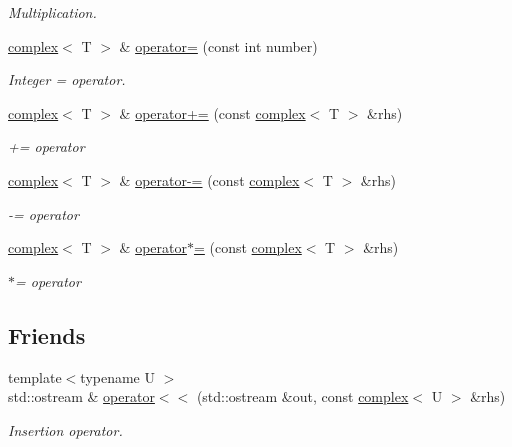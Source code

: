 \begin{DoxyCompactItemize}
\begin{DoxyCompactList}\small\item\em Multiplication. \end{DoxyCompactList}\item 
\hyperlink{classcomplex}{complex}$<$ T $>$ \& \hyperlink{classcomplex_a0e0def25b2e4c7da5c8e845132560d2b}{operator=} (const int number)
\begin{DoxyCompactList}\small\item\em Integer = operator. \end{DoxyCompactList}\item 
\hyperlink{classcomplex}{complex}$<$ T $>$ \& \hyperlink{classcomplex_addf9684dc875ae196619c9fadd5fe48e}{operator+=} (const \hyperlink{classcomplex}{complex}$<$ T $>$ \&rhs)
\begin{DoxyCompactList}\small\item\em += operator \end{DoxyCompactList}\item 
\hyperlink{classcomplex}{complex}$<$ T $>$ \& \hyperlink{classcomplex_a272e86ba6de2f88cb1803127f8ff0481}{operator-\/=} (const \hyperlink{classcomplex}{complex}$<$ T $>$ \&rhs)
\begin{DoxyCompactList}\small\item\em -\/= operator \end{DoxyCompactList}\item 
\hyperlink{classcomplex}{complex}$<$ T $>$ \& \hyperlink{classcomplex_a98240d564a6667f9acf5163821365cdc}{operator$\ast$=} (const \hyperlink{classcomplex}{complex}$<$ T $>$ \&rhs)
\begin{DoxyCompactList}\small\item\em $\ast$= operator \end{DoxyCompactList}\end{DoxyCompactItemize}
\subsection*{Friends}
\begin{DoxyCompactItemize}
\item 
{\footnotesize template$<$typename U $>$ }\\std\+::ostream \& \hyperlink{classcomplex_a860d572e8b354fd76998c8c1309754f9}{operator$<$$<$} (std\+::ostream \&out, const \hyperlink{classcomplex}{complex}$<$ U $>$ \&rhs)
\begin{DoxyCompactList}\small\item\em Insertion operator. \end{DoxyCompactList}\end{DoxyCompactItemize}


